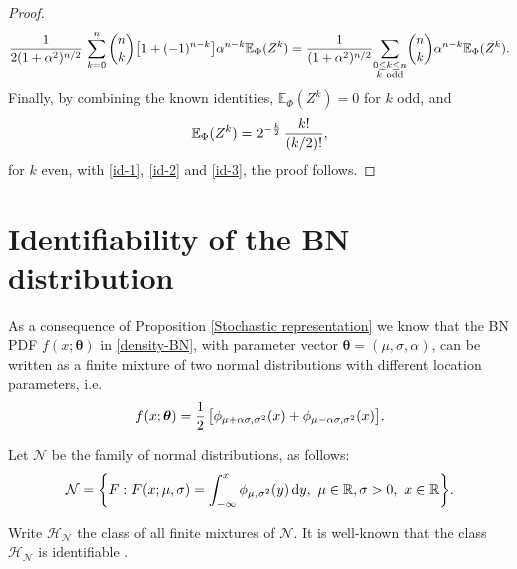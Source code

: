 \documentclass[12pt]{article}
\theoremstyle{definition}
\begin{document}
\begin{proof}
\begin{align}\label{id-3}
{1\over 2(1+\alpha^2)^{n/2}}\, 
\sum_{k=0}^{n}\binom{n}{k} \big[1+(-1)^{n-k}\big] \alpha^{n-k}
\mathbb{E}_{\Phi}(Z^k)
=
{1\over (1+\alpha^2)^{n/2}}
{\sum_{\substack{0\leq k\leq n\\ k\ {\rm odd}}}} \binom{n}{k} \alpha^{n-k} \mathbb{E}_{\Phi}(Z^k).
\end{align}
Finally, by combining the known identities, $\mathbb{E}_{\Phi}(Z^k)=0$ for $k$ odd, and 
\begin{align*}
\mathbb{E}_{\Phi}(Z^k)=2^{-{k\over 2}}\, {k!\over (k/2)!},
\end{align*}
for $k$ even, with \eqref{id-1}, \eqref{id-2} and \eqref{id-3}, the proof follows.
\end{proof}

\section{Identifiability of the BN distribution}\label{Identifiability}

As a consequence of Proposition \ref{Stochastic representation} we know that the BN PDF $f(x;\boldsymbol{\theta})$ in \eqref{density-BN}, with parameter vector $\boldsymbol{\theta} =(\mu,\sigma,\alpha)$, can be written as a finite mixture of two normal distributions with different location parameters, i.e.
\begin{align}\label{eq-eq-dens}
f(x;\boldsymbol{\theta})
=
{1\over 2}\, 
\big[\phi_{\mu+\alpha\sigma, \sigma^2 }(x)
+
\phi_{\mu-\alpha\sigma, \sigma^2}(x)\big].
\end{align}

\smallskip 
Let $\mathcal{N}$ be the family of normal distributions, as follows:
\begin{align*}
\mathcal{N}=\biggl\{F:F(x;\mu,\sigma)=\int_{-\infty}^{x}\phi_{\mu, \sigma^2 }(y)\, {\rm d}y, \ \mu\in\mathbb{R}, \sigma>0,\  x\in\mathbb{R} \biggl\}.
\end{align*}

Write $\mathcal{H}_{\mathcal{N}}$ the class of all finite mixtures of $\mathcal{N}$. It is well-known that the class $\mathcal{H}_{\mathcal{N}}$ is identifiable \citep{Teicher:63}.
\end{document}
